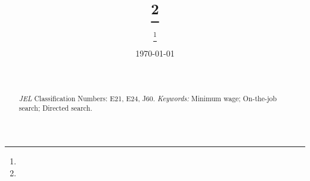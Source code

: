 \documentclass[11pt,fleqn,a4paper]{article}
\begin{document}
\title{ %
\thanks{}} %
\author{ %
\footnote{}} %
\date{\today}
\maketitle

\begin{abstract}
\noindent

\\ %
\\
\noindent\emph{JEL} Classification Numbers: E21, E24, J60. %
\newline\emph{Keywords:} Minimum wage; On-the-job search; Directed search.\\ %
\end{abstract}

\section{} %

\end{document}
